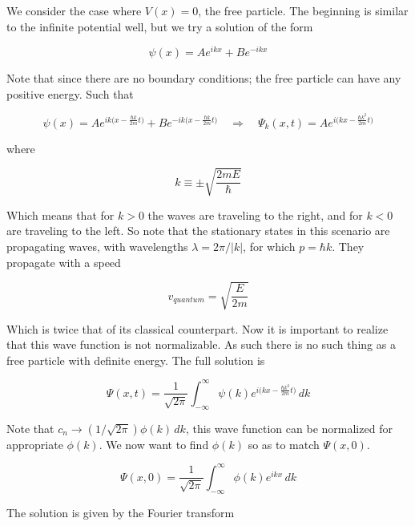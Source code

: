 \documentclass[a4paper]{article}
\begin{document}
We consider the case where $V(x)=0$, the free particle. The beginning is similar to the infinite potential well, but we try a solution of the form

\begin{equation}
	\psi(x)=Ae^{ikx}+Be^{-ikx}
\end{equation}

Note that since there are no boundary conditions; the free particle can have any positive energy. Such that

\begin{equation}
\psi(x)=Ae^{ik\big(x-\frac{\hbar k}{2m}t\big)}+Be^{-ik\big(x-\frac{\hbar k}{2m}t\big)}\quad\Rightarrow\quad \Psi_k(x,t)=Ae^{i\big(kx-\frac{\hbar k^2}{2m}t\big)}
\end{equation}

where

\begin{equation}
	k\equiv\pm\sqrt{\frac{2mE}{\hbar}}
\end{equation}

Which means that for $k>0$ the waves are traveling to the right, and for $k<0$ are traveling to the left. So note that the stationary states in this scenario are propagating waves, with wavelengths $\lambda=2\pi/|k|$, for which $p=\hbar k$. They propagate with a speed 

\begin{equation}
	v_{quantum}=\sqrt{\frac{E}{2m}}
\end{equation}

Which is twice that of its classical counterpart. Now it is important to realize that this wave function is not normalizable. As such there is no such thing as a free particle with definite energy. The full solution is

\begin{equation}
	\Psi(x,t)=\frac{1}{\sqrt{2\pi}}\int_{-\infty}^{\infty}\psi(k)e^{i\big(kx-\frac{\hbar k^2}{2m}t\big)}\,dk
\end{equation}

Note that $c_n\rightarrow (1/\sqrt{2\pi})\phi(k)\,dk$, this wave function can be normalized for appropriate $\phi(k)$. We now want to find $\phi(k)$ so as to match $\Psi(x,0)$.

\begin{equation}
	\Psi(x,0)=\frac{1}{\sqrt{2\pi}}\int_{-\infty}^{\infty}\phi(k)e^{ikx}\,dk
\end{equation}

The solution is given by the Fourier transform
\end{document}
